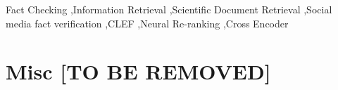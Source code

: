 \documentclass{ceurart}
\begin{document}
\begin{keywords}
  Fact Checking \sep Information Retrieval \sep Scientific Document Retrieval \sep Social media fact verification \sep CLEF \sep Neural Re-ranking \sep Cross Encoder
\end{keywords}

\maketitle



















\section{Misc [TO BE REMOVED]}






\end{document}
